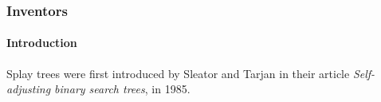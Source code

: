 \documentclass{beamer}
\theoremstyle{plain}
\begin{document}
    \begin{frame}
        \frametitle{Inventors}
        \framesubtitle{Introduction}
    
        Splay trees were first introduced by Sleator and Tarjan in their article \textit{Self-adjusting binary search trees}, in 1985.

        \begin{figure}
            \centering
            \qquad
\end{figure}
\end{frame}
\end{document}
